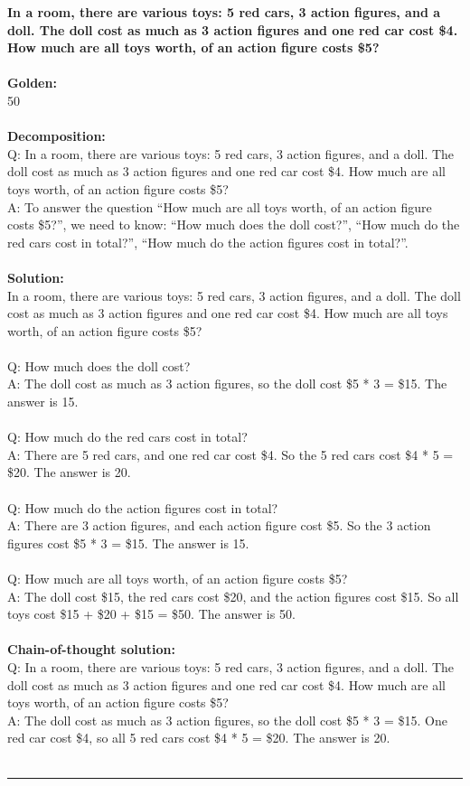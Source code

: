 \noindent
\textbf{In a room, there are various toys: 5 red cars, 3 action figures, and a doll. The doll cost as much as 3 action figures and one red car cost \$4. How much are all toys worth, of an action figure costs \$5?} \\
 \\
\textbf{Golden:} \\
50 \\
 \\
\textbf{Decomposition:} \\
Q: In a room, there are various toys: 5 red cars, 3 action figures, and a doll. The doll cost as much as 3 action figures and one red car cost \$4. How much are all toys worth, of an action figure costs \$5? \\
A: To answer the question ``How much are all toys worth, of an action figure costs \$5?'', we need to know: ``How much does the doll cost?'', ``How much do the red cars cost in total?'', ``How much do the action figures cost in total?''. \\
 \\
\textbf{Solution:} \\
In a room, there are various toys: 5 red cars, 3 action figures, and a doll. The doll cost as much as 3 action figures and one red car cost \$4. How much are all toys worth, of an action figure costs \$5? \\
 \\
Q: How much does the doll cost? \\
A: The doll cost as much as 3 action figures, so the doll cost \$5 * 3 = \$15. The answer is 15. \\
 \\
Q: How much do the red cars cost in total? \\
A: There are 5 red cars, and one red car cost \$4. So the 5 red cars cost \$4 * 5 = \$20. The answer is 20. \\
 \\
Q: How much do the action figures cost in total? \\
A: There are 3 action figures, and each action figure cost \$5. So the 3 action figures cost \$5 * 3 = \$15. The answer is 15. \\
 \\
Q: How much are all toys worth, of an action figure costs \$5? \\
A: The doll cost \$15, the red cars cost \$20, and the action figures cost \$15. So all toys cost \$15 + \$20 + \$15 = \$50. The answer is 50. \\
 \\
\textbf{Chain-of-thought solution:} \\
Q: In a room, there are various toys: 5 red cars, 3 action figures, and a doll. The doll cost as much as 3 action figures and one red car cost \$4. How much are all toys worth, of an action figure costs \$5? \\
A: The doll cost as much as 3 action figures, so the doll cost \$5 * 3 = \$15. One red car cost \$4, so all 5 red cars cost \$4 * 5 = \$20. The answer is 20. \\
 \\
\hrule \bigskip

